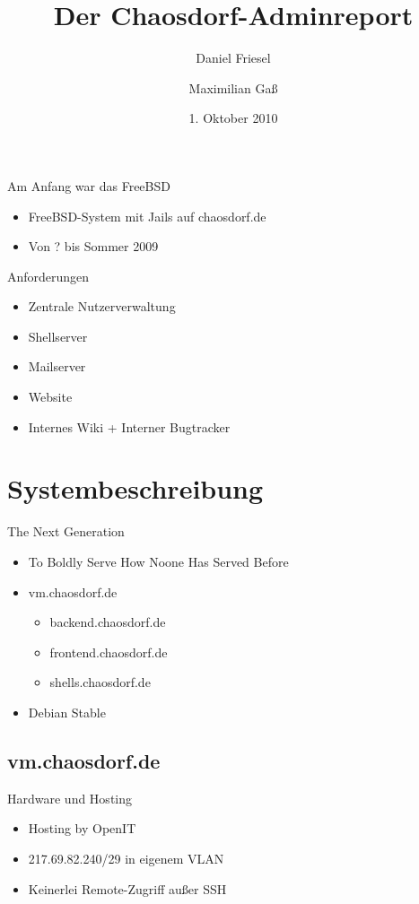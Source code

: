 \documentclass{beamer}
\title[Der Chaosdorf-Adminreport]
	{Der Chaosdorf-Adminreport}
\author{Daniel Friesel \and Maximilian Gaß}
\institute{Chaosdorf}
\date{1. Oktober 2010}
\begin{document}
\begin{frame}
	\titlepage
\end{frame}


\begin{frame}{Am Anfang war das FreeBSD}
	\begin{itemize}
		\item FreeBSD-System mit Jails auf chaosdorf.de
		\pause \item Von ? bis Sommer 2009
	\end{itemize}
\end{frame}

\begin{frame}{Anforderungen}
	\begin{itemize}
		\item Zentrale Nutzerverwaltung
		\item Shellserver
		\item Mailserver
		\item Website
		\item Internes Wiki + Interner Bugtracker
	\end{itemize}
\end{frame}

\section{Systembeschreibung}

\begin{frame}{The Next Generation}
	\begin{itemize}
		\item To Boldly Serve How Noone Has Served Before
	\end{itemize}
	\begin{itemize}
		\pause \item vm.chaosdorf.de
		\begin{itemize}
			\item backend.chaosdorf.de
			\item frontend.chaosdorf.de
			\item shells.chaosdorf.de
		\end{itemize}
	\end{itemize}
	\begin{itemize}
		\pause \item Debian Stable
	\end{itemize}
\end{frame}


\subsection{vm.chaosdorf.de}
\begin{frame}{Hardware und Hosting}
	\begin{itemize}
		\item Hosting by OpenIT
		\item 217.69.82.240/29 in eigenem VLAN
		\pause \item Keinerlei Remote-Zugriff außer SSH
	\end{itemize}
\end{frame}
\end{document}
